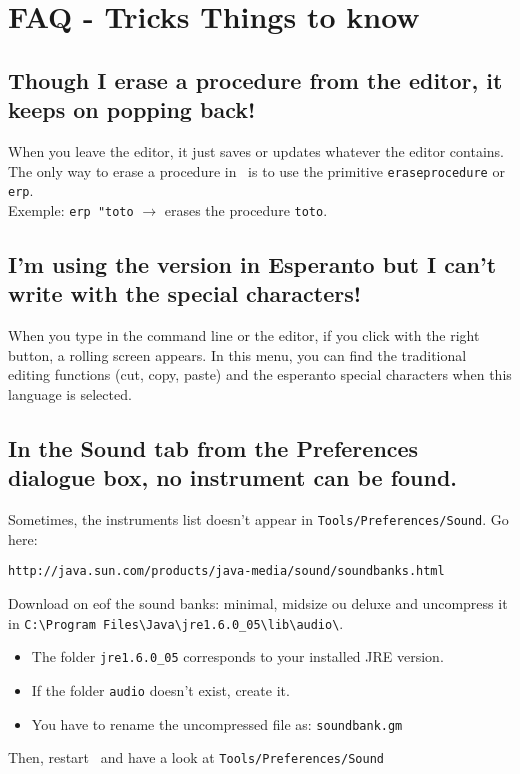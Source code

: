 \chapter{FAQ - Tricks Things to know}
\section{Though I erase a procedure from the editor, it keeps on popping back!}
When you leave the editor, it just saves or updates whatever the editor contains. The only way to erase a procedure in \xlogo\ is to use the primitive \texttt{eraseprocedure} or \texttt{erp}.\\
Exemple: \texttt{erp "toto} $\longrightarrow$ erases the procedure \texttt{toto}.
 \section{I'm using the version in Esperanto but I can't write with the special characters!}
When you type in the command line or the editor, if you click with the right button, a rolling screen appears. In this menu, you can find the traditional editing functions (cut, copy, paste) and the esperanto special characters when this language is selected.
 \section{In the Sound tab from the Preferences dialogue box, no instrument can be found.}
Sometimes, the instruments list doesn't appear in \texttt{Tools/Preferences/Sound}. Go here: 
\begin{center}
 \texttt{http://java.sun.com/products/java-media/sound/soundbanks.html}
\end{center}
Download on eof the sound banks: minimal, midsize ou deluxe and uncompress it in \texttt{C:\textbackslash Program Files\textbackslash Java\textbackslash jre1.6.0\_05\textbackslash lib\textbackslash audio\textbackslash}.\\
\begin{itemize}
 \item The folder  \texttt{jre1.6.0\_05} corresponds to your installed JRE version.
 \item If the folder \texttt{audio} doesn't exist, create it.
 \item You have to rename the uncompressed file as: \texttt{soundbank.gm}
\end{itemize}
\vspace{0.2cm}
\noindent Then, restart \xlogo\ and have a look at \texttt{Tools/Preferences/Sound}
